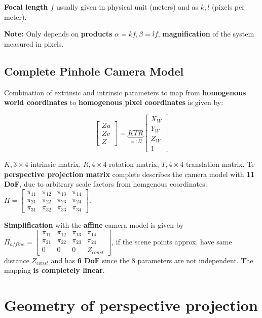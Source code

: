 \textbf{Focal length $f$} usually given in physical unit (meters) and as $k,l$ (pixels per meter).

\textbf{Note:} Only depends on \textbf{products} $\alpha = kf , \beta = lf$, \textbf{magnification} of the system measured in pixels.

\subsection{Complete Pinhole Camera Model}

Combination of extrinsic and intrinsic parameters to map from \textbf{homogenous world coordinates} to \textbf{homogenous pixel coordinates} is given by:

$$\left[\begin{matrix}
Zu \\ Zv \\ Z
\end{matrix}\right] = \underset{=:\Pi}{\underbrace{KTR}} \left[\begin{matrix}
X_W \\ Y_W \\ Z_W \\ 1
\end{matrix}\right]$$

$K, 3\times 4$ intrinsic matrix, $R, 4\times 4$ rotation matrix, $T, 4\times 4$ translation matrix. Te \textbf{perspective projection matrix} complete describes the camera model with \textbf{11 DoF}, due to arbitrary scale factors from homgenous coordinates: $\Pi = \left[\begin{matrix}
    \pi_{11} & \pi_{12} & \pi_{13} & \pi_{14} \\
    \pi_{21} & \pi_{22} & \pi_{23} & \pi_{24} \\
    \pi_{31} & \pi_{32} & \pi_{33} & \pi_{34}
\end{matrix}\right]$. 

\textbf{Simplification} with the \textbf{affine} camera model is given by $\Pi_{affine} = \left[\begin{matrix}
    \pi_{11} & \pi_{12} & \pi_{13} & \pi_{14} \\
    \pi_{21} & \pi_{22} & \pi_{23} & \pi_{24} \\
    0&0&0&Z_{const}
\end{matrix}\right]$, if the scene points approx. have same distance $Z_{const}$ and has \textbf{6 DoF} since the 8 parameters are not independent. The mapping \textbf{is completely linear}.

\section{Geometry of perspective projection}

